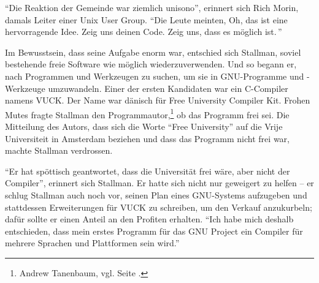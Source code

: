 "`Die Reaktion der Gemeinde war ziemlich unisono"', erinnert sich Rich Morin, damals Leiter einer Unix User Group. "`Die Leute meinten, \glq Oh, das ist eine hervorragende Idee. Zeig uns deinen Code. Zeig uns, dass es möglich ist.\grq\,"'

Im Bewusstsein, dass seine Aufgabe enorm war, entschied sich Stallman, soviel bestehende freie Software wie möglich wiederzuverwenden. Und so begann er, nach  Programmen und Werkzeugen zu suchen, um sie in GNU-Programme und -Werkzeuge umzuwandeln. Einer der ersten Kandidaten war ein C-Compiler namens VUCK. Der Name war dänisch für Free University Compiler Kit. Frohen Mutes fragte Stallman den Programmautor,\footnote{Andrew Tanenbaum, vgl. Seite \pageref{Tanenbaum}.} ob das Programm frei sei. Die Mitteilung des Autors, dass sich die Worte "`Free University"' auf die Vrije Universiteit in Amsterdam beziehen und dass das Programm nicht frei war, machte Stallman verdrossen.

"`Er hat spöttisch geantwortet, dass die Universität frei wäre, aber nicht der Compiler"', erinnert sich Stallman. Er hatte sich nicht nur geweigert zu helfen – er schlug Stallman auch noch vor, seinen Plan eines GNU-Systems aufzugeben und stattdessen Erweiterungen für VUCK zu schreiben, um den Verkauf anzukurbeln; dafür sollte er einen Anteil an den Profiten erhalten. "`Ich habe mich deshalb entschieden, dass mein erstes Programm für das GNU Project ein Compiler für mehrere Sprachen und Plattformen sein wird."'

